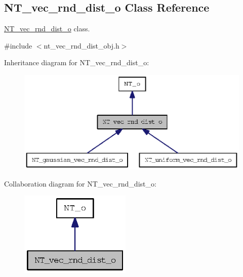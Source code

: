 \subsection{NT\_\-vec\_\-rnd\_\-dist\_\-o Class Reference}
\label{class_n_t__vec__rnd__dist__o}


\hyperlink{class_n_t__vec__rnd__dist__o}{NT\_\-vec\_\-rnd\_\-dist\_\-o} class.  




{\ttfamily \#include $<$nt\_\-vec\_\-rnd\_\-dist\_\-obj.h$>$}



Inheritance diagram for NT\_\-vec\_\-rnd\_\-dist\_\-o:
\nopagebreak
\begin{figure}[H]
\begin{center}
\leavevmode
\includegraphics[width=364pt]{class_n_t__vec__rnd__dist__o__inherit__graph}
\end{center}
\end{figure}


Collaboration diagram for NT\_\-vec\_\-rnd\_\-dist\_\-o:
\nopagebreak
\begin{figure}[H]
\begin{center}
\leavevmode
\includegraphics[width=150pt]{class_n_t__vec__rnd__dist__o__coll__graph}
\end{center}
\end{figure}
